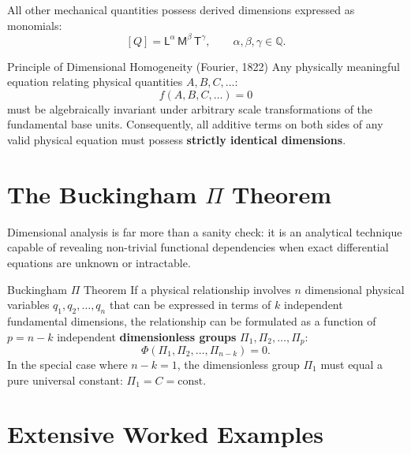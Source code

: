 All other mechanical quantities possess derived dimensions expressed as monomials:
\[
[Q] = \mathsf{L}^\alpha\,\mathsf{M}^\beta\,\mathsf{T}^\gamma, \qquad \alpha, \beta, \gamma \in \mathbb{Q}.
\]

\begin{lawbox}{Principle of Dimensional Homogeneity (Fourier, 1822)}
Any physically meaningful equation relating physical quantities $A, B, C, \dots$:
\[
f(A, B, C, \dots) = 0
\]
must be algebraically invariant under arbitrary scale transformations of the fundamental base units. Consequently, all additive terms on both sides of any valid physical equation must possess \textbf{strictly identical dimensions}.
\end{lawbox}

\section{The Buckingham $\Pi$ Theorem}

Dimensional analysis is far more than a sanity check: it is an analytical technique capable of revealing non-trivial functional dependencies when exact differential equations are unknown or intractable.

\begin{lawbox}{Buckingham $\Pi$ Theorem}
If a physical relationship involves $n$ dimensional physical variables $q_1, q_2, \dots, q_n$ that can be expressed in terms of $k$ independent fundamental dimensions, the relationship can be formulated as a function of $p = n - k$ independent \textbf{dimensionless groups} $\Pi_1, \Pi_2, \dots, \Pi_p$:
\[
\Phi(\Pi_1, \Pi_2, \dots, \Pi_{n-k}) = 0.
\]
In the special case where $n - k = 1$, the dimensionless group $\Pi_1$ must equal a pure universal constant: $\Pi_1 = C = \text{const}$.
\end{lawbox}

\section{Extensive Worked Examples}

